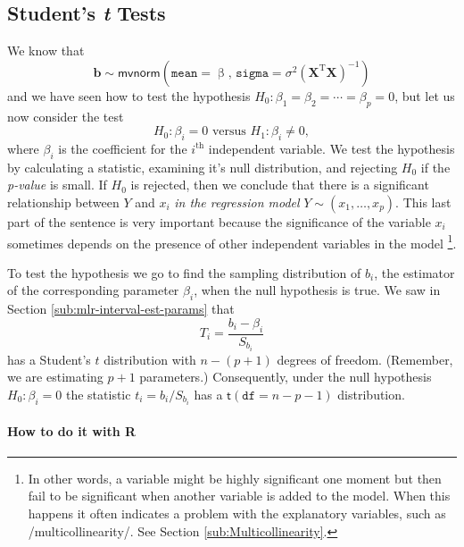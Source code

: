 \documentclass[captions=tableheading]{scrbook}
\begin{document}
\subsection{Student's \emph{t} Tests}
\label{sec-7-3-3}

\label{sub:mlr-Student's-t-Tests}

We know that
\begin{equation}
\mathbf{b}\sim\mathsf{mvnorm}\left(\mathtt{mean}=\upbeta,\,\mathtt{sigma}=\sigma^{2}\left(\mathbf{X}^{\mathrm{T}}\mathbf{X}\right)^{-1}\right)
\end{equation}
and we have seen how to test the hypothesis \(H_{0}:\beta_{1}=\beta_{2}=\cdots=\beta_{p}=0\), but let us now consider the test
\begin{equation}
H_{0}:\beta_{i}=0\mbox{ versus }H_{1}:\beta_{i}\neq0,
\end{equation}
where \(\beta_{i}\) is the coefficient for the \(i^{\textrm{th}}\) independent variable. We test the hypothesis by calculating a statistic, examining it's null distribution, and rejecting \(H_{0}\) if the \emph{p-value} is small. If \(H_{0}\) is rejected, then we conclude that there is a significant relationship between \(Y\) and \(x_{i}\) \emph{in the regression model} \(Y\sim(x_{1},\ldots,x_{p})\). This last part of the sentence is very important because the significance of the variable \(x_{i}\) sometimes depends on the presence of other independent variables in the model
\footnote{In other words, a variable might be highly significant one moment but then fail to be significant when another variable is added to the model. When this happens it often indicates a problem with the explanatory variables, such as /multicollinearity/. See Section \ref{sub:Multicollinearity}.}.

To test the hypothesis we go to find the sampling distribution of \( b_{i} \), the estimator of the corresponding parameter \( \beta_{i} \), when the null hypothesis is true. We saw in Section \ref{sub:mlr-interval-est-params} that 
\begin{equation}
T_{i}=\frac{b_{i}-\beta_{i}}{S_{b_{i}}}
\end{equation}
has a Student's \(t\) distribution with \(n-(p+1)\) degrees of freedom. (Remember, we are estimating \(p+1\) parameters.) Consequently, under the null hypothesis \(H_{0}:\beta_{i}=0\) the statistic \(t_{i}=b_{i}/S_{b_{i}}\) has a \(\mathsf{t}(\mathtt{df}=n-p-1)\) distribution.


\paragraph*{How to do it with \textsf{R}}
\end{document}
